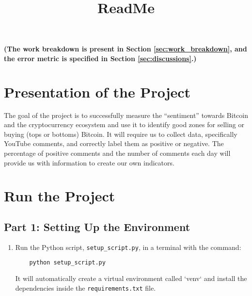 \documentclass[12pt,a4paper]{article}
\title{\textbf{ReadMe}}
\author{}
\date{}
\begin{document}
\maketitle

\noindent\textbf{(The work breakdown is present in Section \ref{sec:work_breakdown}, and the error metric is specified in Section \ref{sec:discussions}.)}

\section*{Presentation of the Project}

The goal of the project is to successfully measure the ``sentiment'' towards Bitcoin and the cryptocurrency ecosystem and use it to identify good zones for selling or buying (tops or bottoms) Bitcoin. It will require us to collect data, specifically YouTube comments, and correctly label them as positive or negative. The percentage of positive comments and the number of comments each day will provide us with information to create our own indicators.

\section{Run the Project}
\subsection*{Part 1: Setting Up the Environment}
\begin{enumerate}[label=Step \arabic*:]
    \item Run the Python script, \texttt{setup\_script.py}, in a terminal with the command:
    \begin{verbatim}
    python setup_script.py
    \end{verbatim}
    It will automatically create a virtual environment called `venv` and install the dependencies inside the \texttt{requirements.txt} file.
\end{enumerate}
\end{document}
